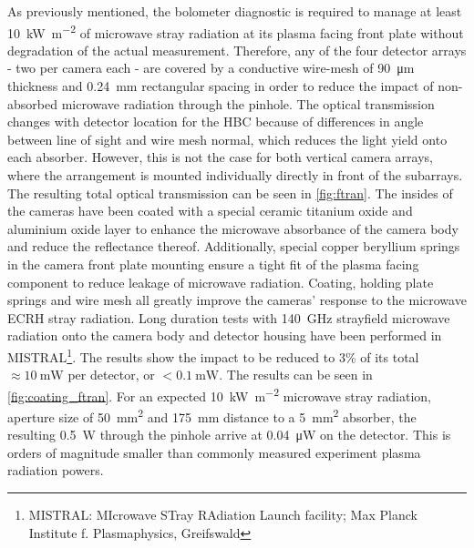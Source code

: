             As previously mentioned, the bolometer diagnostic is required to manage at least \SI{10}{\kilo\watt\per\square\meter} of microwave stray radiation at its plasma facing front plate without degradation of the actual measurement. Therefore, any of the four detector arrays - two per camera each - are covered by a conductive wire-mesh of \SI{90}{\micro\meter} thickness and \SI{0.24}{\milli\meter} rectangular spacing in order to reduce the impact of non-absorbed microwave radiation through the pinhole. The optical transmission changes with detector location for the HBC because of differences in angle between line of sight and wire mesh normal, which reduces the light yield onto each absorber. However, this is not the case for both vertical camera arrays, where the arrangement is mounted individually directly in front of the subarrays. The resulting total optical transmission can be seen in \cref{fig:ftran}. The insides of the cameras have been coated with a special ceramic titanium oxide and aluminium oxide layer to enhance the microwave absorbance of the camera body and reduce the reflectance thereof. Additionally, special copper beryllium springs in the camera front plate mounting ensure a tight fit of the plasma facing component to reduce leakage of microwave radiation. Coating, holding plate springs and wire mesh all greatly improve the cameras' response to the microwave ECRH stray radiation\cite{Hirsch2013,Floristan2011}. Long duration tests with \SI{140}{\giga\hertz} strayfield microwave radiation onto the camera body and detector housing have been performed in MISTRAL\footnote[1]{MISTRAL: MIcrowave STray RAdiation Launch facility; Max Planck Institute f. Plasmaphysics, Greifswald}. The results show the impact to be reduced to 3\% of its total $\approx\SI{10}{\milli\watt}$ per detector, or $<\SI{0.1}{\milli\watt}$. The results can be seen in \cref{fig:coating_ftran}. For an expected \SI{10}{\kilo\watt\per\square\meter} microwave stray radiation, aperture size of \SI{50}{\square\milli\meter} and \SI{175}{\milli\meter} distance to a \SI{5}{\square\milli\meter} absorber, the resulting \SI{0.5}{\watt} through the pinhole arrive at \SI{0.04}{\micro\watt} on the detector. This is orders of magnitude smaller than commonly measured experiment plasma radiation powers.\\%
%
